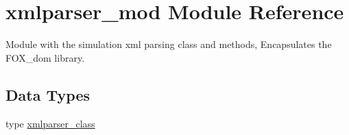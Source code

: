 \hypertarget{namespacexmlparser__mod}{}\section{xmlparser\+\_\+mod Module Reference}
\label{namespacexmlparser__mod}


Module with the simulation xml parsing class and methods, Encapsulates the F\+O\+X\+\_\+dom library.  


\subsection*{Data Types}
\begin{DoxyCompactItemize}
\item 
type \mbox{\hyperlink{structxmlparser__mod_1_1xmlparser__class}{xmlparser\+\_\+class}}
\end{DoxyCompactItemize}

